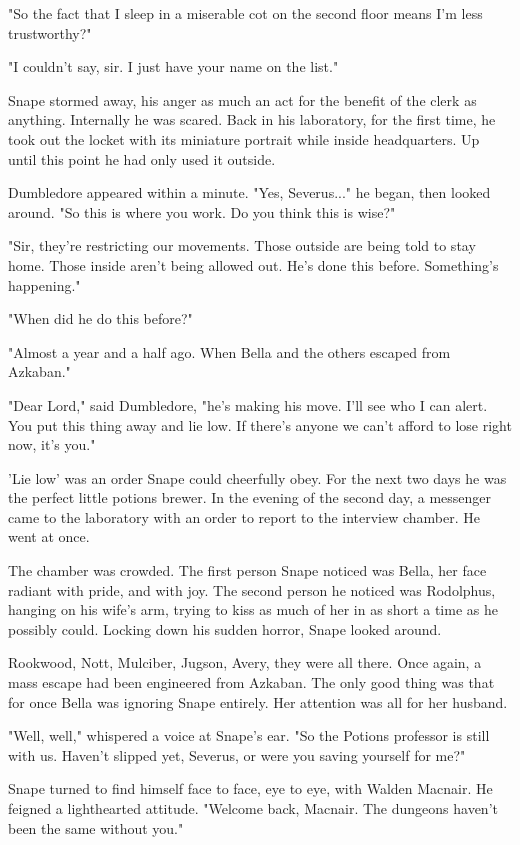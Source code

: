 \documentclass[a4paper,11pt]{article}
\begin{document}
"So the fact that I sleep in a miserable cot on the second floor means I'm less trustworthy?"

"I couldn't say, sir. I just have your name on the list."

Snape stormed away, his anger as much an act for the benefit of the clerk as anything. Internally he was scared. Back in his laboratory, for the first time, he took out the locket with its miniature portrait while inside headquarters. Up until this point he had only used it outside.

Dumbledore appeared within a minute. "Yes, Severus..." he began, then looked around. "So this is where you work. Do you think this is wise?"

"Sir, they're restricting our movements. Those outside are being told to stay home. Those inside aren't being allowed out. He's done this before. Something's happening."

"When did he do this before?"

"Almost a year and a half ago. When Bella and the others escaped from Azkaban."

"Dear Lord," said Dumbledore, "he's making his move. I'll see who I can alert. You put this thing away and lie low. If there's anyone we can't afford to lose right now, it's you."

'Lie low' was an order Snape could cheerfully obey. For the next two days he was the perfect little potions brewer. In the evening of the second day, a messenger came to the laboratory with an order to report to the interview chamber. He went at once.

The chamber was crowded. The first person Snape noticed was Bella, her face radiant with pride, and with joy. The second person he noticed was Rodolphus, hanging on his wife's arm, trying to kiss as much of her in as short a time as he possibly could. Locking down his sudden horror, Snape looked around.

Rookwood, Nott, Mulciber, Jugson, Avery, they were all there. Once again, a mass escape had been engineered from Azkaban. The only good thing was that for once Bella was ignoring Snape entirely. Her attention was all for her husband.

"Well, well," whispered a voice at Snape's ear. "So the Potions professor is still with us. Haven't slipped yet, Severus, or were you saving yourself for me?"

Snape turned to find himself face to face, eye to eye, with Walden Macnair. He feigned a lighthearted attitude. "Welcome back, Macnair. The dungeons haven't been the same without you."
\end{document}
